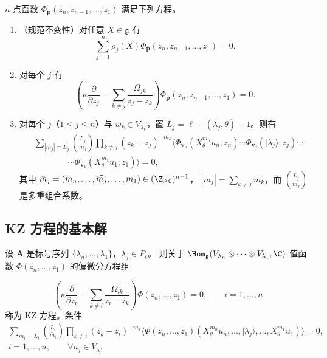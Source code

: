 \begin{theorem}[6.17]
$n$-点函数 $\Phi_{\bar{\mathbf{p}}}(z_n,z_{n-1},\dots,z_1)$ 满足下列方程。
\begin{enumerate}[label=\arabic*.]
\item （规范不变性）对任意 $X\in\mathfrak{g}$ 有
\[
\sum_{j=1}^n\rho_j(X)\Phi_{\bar{\mathbf{p}}}(z_n,z_{n-1},\dots,z_1)=0 .
\]
\item 对每个 $j$ 有
\[
\left(\kappa\frac{\partial}{\partial z_j}
-\sum_{k\ne j}\frac{\Omega_{jk}}{z_j-z_k}\right)
\Phi_{\bar{\mathbf{p}}}(z_n,z_{n-1},\dots,z_1)=0 .
\]
\item 对每个 $j$（$1\le j\le n$）与 $w_k\in V_{\lambda_k}$，置
$L_j=\ell-(\lambda_j,\theta)+1$。则有
\[
\begin{aligned}
&\sum_{|\bar{m}_j|=L_j}\binom{L_j}{\bar{m}_j}
 \prod_{k\ne j}(z_k-z_j)^{-m_k}
 \langle\Phi_{\mathbf{v}_n}(X_\theta^{m_n}u_n;z_n)\cdots
 \Phi_{\mathbf{v}_j}(|\lambda_j\rangle;z_j)\cdots\\
&\qquad\qquad\cdots\Phi_{\mathbf{v}_1}(X_\theta^{m_1}u_1;z_1)\rangle=0,
\end{aligned}
\]
其中 $\bar{m}_j=(m_n,\dots,\widehat{m_j},\dots,m_1)\in(\Z_{\ge0})^{n-1}$，
$|\bar{m}_j|=\sum_{k\ne j}m_k$，而 $\binom{L_j}{\bar{m}_j}$ 是多重组合系数。
\end{enumerate}
\end{theorem}


\subsection{KZ 方程的基本解}

{\emergencystretch=5.2pt 设 $\mathbf{A}$ 是标号序列 $\{\lambda_n,\dots,\lambda_1\}$，$\lambda_j\in P_\ell$。
则关于 $\Hom_{\mathfrak{g}}(V_{\lambda_n}\otimes\cdots\otimes V_{\lambda_1},\C)$
值函数 $\Phi(z_n,\dots,z_1)$ 的偏微分方程组\par}
\begin{equation}
\left(\kappa\frac{\partial}{\partial z_i}
-\sum_{k\ne i}\frac{\Omega_{ik}}{z_i-z_k}\right)\Phi(z_n,\dots,z_1)=0,
\qquad i=1,\dots,n \tag{6.27}
\end{equation}
称为 KZ 方程。条件
\begin{equation}
\begin{gathered}
\sum_{\bar{m}_i=L_i}\binom{L_i}{\bar{m}_i}
\prod_{k\ne i}(z_k-z_i)^{-m_k}
\langle\Phi(z_n,\dots,z_1)(X_\theta^{m_n}u_n,\dots,|\lambda_j\rangle,\dots,
X_\theta^{m_1}u_1)\rangle=0,\\
i=1,\dots,n,\qquad \forall u_j\in V_\lambda ,
\end{gathered}
\tag{6.28}
\end{equation}

